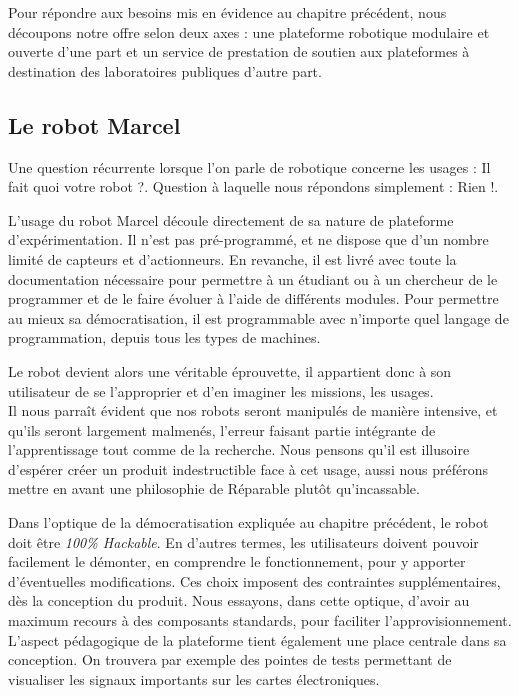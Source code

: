 \documentclass[a4paper,12pt]{report}
\begin{document}
Pour répondre aux besoins mis en évidence au chapitre précédent, nous découpons notre offre selon deux axes :
une plateforme robotique modulaire et ouverte d'une part et un service de prestation de soutien aux plateformes à destination des laboratoires publiques d'autre part.
\subsection{Le robot Marcel}
Une question récurrente lorsque l'on parle de robotique concerne les usages : \og{}Il fait quoi votre robot ?\fg{}.
Question à laquelle nous répondons simplement : \og{}Rien !\fg{}.

L'usage du robot Marcel découle directement de sa nature de plateforme d'expérimentation.
Il n'est pas pré-programmé, et ne dispose que d'un nombre limité de capteurs et d'actionneurs.
En revanche, il est livré avec toute la documentation nécessaire pour permettre à un étudiant ou à un chercheur de le programmer et de le faire évoluer à l'aide de différents modules.
Pour permettre au mieux sa démocratisation, il est programmable avec n'importe quel langage de programmation, depuis tous les types de machines.

Le robot devient alors une véritable éprouvette, il appartient donc à son utilisateur de se l'approprier et d'en imaginer les missions, les usages.\\

Il nous parraît évident que nos robots seront manipulés de manière intensive, et qu'ils seront largement malmenés, l'erreur faisant partie intégrante de l'apprentissage tout comme de la recherche.
Nous pensons qu'il est illusoire d'espérer créer un produit indestructible face à cet usage, aussi nous préférons mettre en avant une philosophie de \og{}Réparable plutôt qu'incassable\fg{}.

Dans l'optique de la démocratisation expliquée au chapitre précédent, le robot doit être \emph{100\% Hackable}.
En d'autres termes, les utilisateurs doivent pouvoir facilement le démonter, en comprendre le fonctionnement, pour y apporter d'éventuelles modifications.
Ces choix imposent des contraintes supplémentaires, dès la conception du produit.
Nous essayons, dans cette optique, d'avoir au maximum recours à des composants standards, pour faciliter l'approvisionnement.
L'aspect pédagogique de la plateforme tient également une place centrale dans sa conception.
On trouvera par exemple des pointes de tests permettant de visualiser les signaux importants sur les cartes électroniques.\\
\end{document}
